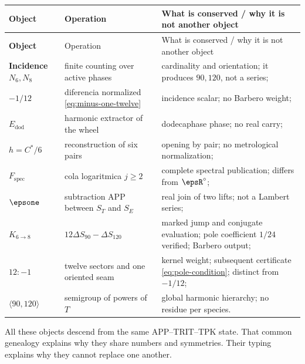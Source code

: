 \begin{longtable}{>{\bfseries}p{} p{} p{}}
\toprule
Object & Operation & What is conserved / why it is not another object\\
\midrule
\endfirsthead
\toprule
Object & Operation & What is conserved / why it is not another object\\
\midrule
\endhead
Incidence \(N_6,N_8\) & finite counting over active phases & cardinality and orientation; it produces \(90,120\), not a series;\\
\(-1/12\) & diferencia normalized \eqref{eq:minus-one-twelve} & incidence scalar; no Barbero weight;\\
\(E_{\mathrm{dod}}\) & harmonic extractor of the wheel & dodecaphase phase; no real carry;\\
\(h=C^*/6\) & reconstruction of six pairs & opening by pair; no metrological normalization;\\
\(F_{\mathrm{spec}}\) & cola logaritmica \(j\ge2\) & complete spectral publication; differs from \(\epsR^\circ\);\\
\(\epsone\) & subtraction APP between \(S_T\) and \(S_E\) & real join of two lifts; not a Lambert series;\\
\(K_{6\to8}\) & \(12\Delta S_{90}-\Delta S_{120}\) & marked jump and conjugate evaluation; pole coefficient \(1/24\) verified; Barbero output;\\
\(12:-1\) & twelve sectors and one oriented seam & kernel weight; subsequent certificate \eqref{eq:pole-condition}; distinct from \(-1/12\);\\
\(\langle90,120\rangle\) & semigroup of powers of \(T\) & global harmonic hierarchy; no residue per species.\\
\bottomrule
\end{longtable}

\begin{thesisbox}
All these objects descend from the same APP--TRIT--TPK state. That common genealogy explains why they share numbers and symmetries. Their typing explains why they cannot replace one another.
\end{thesisbox}
